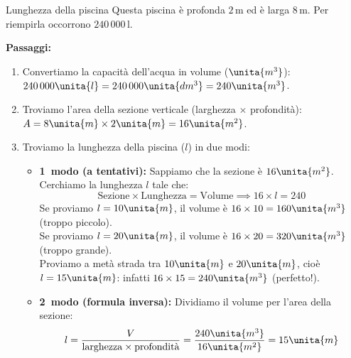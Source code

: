 \begin{esercizio}{Lunghezza della piscina}
Questa piscina è profonda $2\,\mathrm{m}$ ed è larga $8\,\mathrm{m}$. Per riempirla occorrono $240\,000\,\mathrm{l}$.



\responsespace{4.8cm}

\begin{soluzione}
  \textbf{Passaggi:}
  \begin{enumerate}
    \item Convertiamo la capacità dell'acqua in volume ($\unita{m^3}$): $240\,000\unita{l} = 240\,000\unita{dm^3} = 240\unita{m^3}$.
    \item Troviamo l'area della sezione verticale (larghezza $\times$ profondità): $A = 8\unita{m} \times 2\unita{m} = 16\unita{m^2}$.
    \item Troviamo la lunghezza della piscina ($l$) in due modi:
    \begin{itemize}
      \item \textbf{1\textdegree\ modo (a tentativi):} Sappiamo che la sezione è $16\unita{m^2}$. Cerchiamo la lunghezza $l$ tale che:
      \[
      \text{Sezione} \times \text{Lunghezza} = \text{Volume} \implies 16 \times l = 240
      \]
      Se proviamo $l = 10\unita{m}$, il volume è $16 \times 10 = 160\unita{m^3}$ (troppo piccolo).\\
      Se proviamo $l = 20\unita{m}$, il volume è $16 \times 20 = 320\unita{m^3}$ (troppo grande).\\
      Proviamo a metà strada tra $10\unita{m}$ e $20\unita{m}$, cioè $l = 15\unita{m}$: infatti $16 \times 15 = 240\unita{m^3}$ (perfetto!).
      \item \textbf{2\textdegree\ modo (formula inversa):} Dividiamo il volume per l'area della sezione:
      \[
      l = \frac{V}{\text{larghezza} \times \text{profondità}} = \frac{240\unita{m^3}}{16\unita{m^2}} = 15\unita{m}
      \]
    \end{itemize}
  \end{enumerate}
\end{soluzione}
\end{esercizio}

\condnewpage

